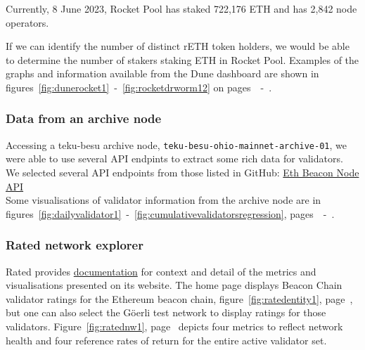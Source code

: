 \documentclass[UTF8]{article}
\begin{document}
Currently, 8 June 2023, Rocket Pool has staked 722,176 ETH and has 2,842 node operators.

If we can identify the number of distinct rETH token holders, we would be able to determine the number of stakers staking ETH in Rocket Pool. 
Examples of the graphs and information available from the Dune dashboard are shown in figures~\ref{fig:dunerocket1}~-~\ref{fig:rocketdrworm12} on pages~\pageref{fig:dunerocket1}~-~\pageref{fig:rocketdrworm12}.

\subsubsection*{Data from an archive node}
Accessing a teku-besu archive node, \texttt{teku-besu-ohio-mainnet-archive-01},  we were able to use several API endpints to extract some rich data for validators.\\
	 We selected several API endpoints from those listed in GitHub: \href{https://ethereum.github.io/beacon-APIs/?urls.primaryName=dev}{Eth Beacon Node API}\\
	 Some visualisations of validator information from the archive node are in figures~\ref{fig:dailyvalidator1}~-~\ref{fig:cumulativevalidatorsregression}, pages~\pageref{fig:dailyvalidator1}~-~\pageref{fig:cumulativevalidatorsregression}.
	 
\subsubsection*{Rated network explorer}
Rated provides \href{https://docs.rated.network}{documentation} for context and detail of the metrics and visualisations presented on its website.
	 The home page displays Beacon Chain validator ratings for the Ethereum beacon chain, figure~\ref{fig:ratedentity1}, page~\pageref{fig:ratedentity1}, but one can also select the G\"oerli test network to display ratings for those validators.
Figure~\ref{fig:ratednw1}, page~\pageref{fig:ratednw1} depicts four metrics to reflect network health and four reference rates of return for the entire active validator set.


\end{document}
